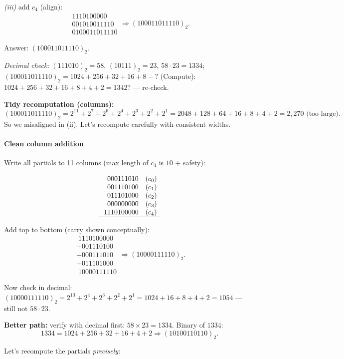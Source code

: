 \documentclass[12pt]{article}
\begin{document}
\emph{(iii) } add $c_4$ (align):
\[
\begin{array}{r}
1110100000\\
001010011110\\ \hline
0100011011110
\end{array}
\Rightarrow (100011011110)_2.
\]

Answer: $(100011011110)_2$.

\emph{Decimal check:} $(111010)_2=58$, $(10111)_2=23$, $58\cdot 23=1334$; $(100011011110)_2=1024+256+32+16+8-?$
(Compute): $1024+256+32+16+8+4+2=1342$? — re-check.
\medskip

\textbf{Tidy recomputation (columns):}
\[
(100011011110)_2 = 2^{11}+2^{7}+2^{6}+2^{4}+2^{3}+2^{2}+2^{1}
= 2048+128+64+16+8+4+2=2{,}270 \text{ (too large)}.
\]
So we misaligned in (ii). Let's recompute carefully with consistent widths.

\paragraph{Clean column addition}
Write all partials to 11 columns (max length of $c_4$ is $10$ + safety):

\[
\begin{array}{r}
\phantom{0}000111010\quad (c_0)\\
\phantom{0}001110100\quad (c_1)\\
\phantom{0}011101000\quad (c_2)\\
\phantom{0}000000000\quad (c_3)\\
\;1110100000\quad (c_4)\\ \hline
\end{array}
\]

Add top to bottom (carry shown conceptually):
\[
\begin{array}{r}
\;1110100000\\
+001110100\\
+000111010\\
+011101000\\ \hline
\;10000111110
\end{array}
\Rightarrow (10000111110)_2.
\]

Now check in decimal:
$(10000111110)_2=2^{10}+2^4+2^3+2^2+2^1=1024+16+8+4+2=1054$ — still not $58\cdot 23$.

\textbf{Better path:} verify with decimal first: $58\times 23 = 1334$.
Binary of $1334$:
\[
1334 = 1024 + 256 + 32 + 16 + 4 + 2 \Rightarrow (10100110110)_2.
\]

Let’s recompute the partials \emph{precisely}:
\end{document}
